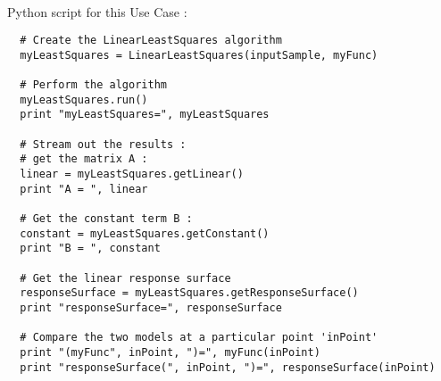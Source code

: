 \textspace\\
Python  script for this Use Case :

\begin{lstlisting}
  # Create the LinearLeastSquares algorithm
  myLeastSquares = LinearLeastSquares(inputSample, myFunc)

  # Perform the algorithm
  myLeastSquares.run()
  print "myLeastSquares=", myLeastSquares

  # Stream out the results :
  # get the matrix A :
  linear = myLeastSquares.getLinear()
  print "A = ", linear

  # Get the constant term B :
  constant = myLeastSquares.getConstant()
  print "B = ", constant

  # Get the linear response surface
  responseSurface = myLeastSquares.getResponseSurface()
  print "responseSurface=", responseSurface

  # Compare the two models at a particular point 'inPoint'
  print "(myFunc", inPoint, ")=", myFunc(inPoint)
  print "responseSurface(", inPoint, ")=", responseSurface(inPoint)
\end{lstlisting}
